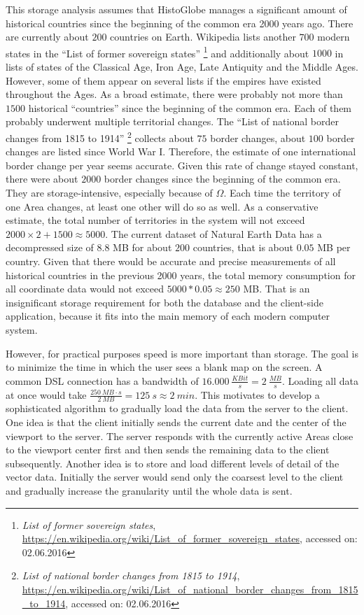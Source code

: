 This storage analysis assumes that HistoGlobe manages a significant amount of historical countries since the beginning of the common era 2000 years ago. There are currently about $200$ countries on Earth. Wikipedia lists another $700$ modern states in the ``List of former sovereign states''
\footnote{
  \emph{List of former sovereign states},
  \url{https://en.wikipedia.org/wiki/List_of_former_sovereign_states},
  accessed on: 02.06.2016
}
and additionally about $1000$ in lists of states of the Classical Age, Iron Age, Late Antiquity and the Middle Ages. However, some of them appear on several lists if the empires have existed throughout the Ages. As a broad estimate, there were probably not more than $1500$ historical ``countries'' since the beginning of the common era. Each of them probably underwent multiple territorial changes. The ``List of national border changes from 1815 to 1914''
\footnote{
  \emph{List of national border changes from 1815 to 1914},
  \url{https://en.wikipedia.org/wiki/List_of_national_border_changes_from_1815_to_1914},
  accessed on: 02.06.2016
}
collects about $75$ border changes, about $100$ border changes are listed since World War I. Therefore, the estimate of one international border change per year seems accurate. Given this rate of change stayed constant, there were about $2000$ border changes since the beginning of the common era. They are storage-intensive, especially because of $\Omega$. Each time the territory of one Area changes, at least one other will do so as well. As a conservative estimate, the total number of territories in the system will not exceed $2000 \times 2 + 1500 \approx 5000$. The current dataset of Natural Earth Data has a decompressed size of $8.8$ MB for about $200$ countries, that is about $0.05$ MB per country. Given that there would be accurate and precise measurements of all historical countries in the previous 2000 years, the total memory consumption for all coordinate data would not exceed $5000 * 0.05 \approx 250$ MB. That is an insignificant storage requirement for both the database and the client-side application, because it fits into the main memory of each modern computer system.

However, for practical purposes speed is more important than storage.
The goal is to minimize the time in which the user sees a blank map on the screen.
A common DSL connection has a bandwidth of $16.000 ~\frac{KBit}{s} = 2 ~\frac{MB}{s}$. Loading all data at once would take $\frac{250 ~MB \cdot s}{2 ~MB} = 125 ~s \approx 2 ~min $. This motivates to develop a sophisticated algorithm to gradually load the data from the server to the client.
One idea is that the client initially sends the current date and the center of the viewport to the server. The server responds with the currently active Areas close to the viewport center first and then sends the remaining data to the client subsequently.
Another idea is to store and load different levels of detail of the vector data. Initially the server would send only the coarsest level to the client and gradually increase the granularity until the whole data is sent.


